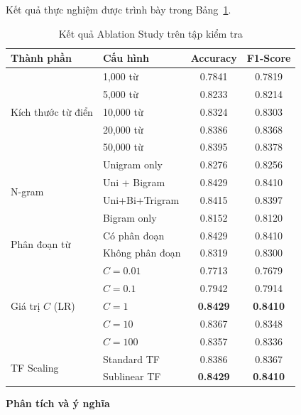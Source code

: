 \documentclass[12pt, a4paper]{report}
\newcommand{\ablVocOneKAcc}{0.7841}
\newcommand{\ablVocOneKF}{0.7819}
\newcommand{\ablVocFiveKAcc}{0.8233}
\newcommand{\ablVocFiveKF}{0.8214}
\newcommand{\ablVocTenKAcc}{0.8324}
\newcommand{\ablVocTenKF}{0.8303}
\newcommand{\ablVocTwentyKAcc}{0.8386}
\newcommand{\ablVocTwentyKF}{0.8368}
\newcommand{\ablVocFiftyKAcc}{0.8395}
\newcommand{\ablVocFiftyKF}{0.8378}
\newcommand{\ablNgUniAcc}{0.8276}
\newcommand{\ablNgUniF}{0.8256}
\newcommand{\ablNgUniBiAcc}{0.8429}
\newcommand{\ablNgUniBiF}{0.8410}
\newcommand{\ablNgUniTriAcc}{0.8415}
\newcommand{\ablNgUniTriF}{0.8397}
\newcommand{\ablNgBiAcc}{0.8152}
\newcommand{\ablNgBiF}{0.8120}
\newcommand{\ablWsOnAcc}{0.8429}
\newcommand{\ablWsOnF}{0.8410}
\newcommand{\ablWsOffAcc}{0.8319}
\newcommand{\ablWsOffF}{0.8300}
\newcommand{\ablCaAcc}{0.7713}        %
\newcommand{\ablCaF}{0.7679}
\newcommand{\ablCbAcc}{0.7942}        %
\newcommand{\ablCbF}{0.7914}
\newcommand{\ablCcAcc}{0.8429}        %
\newcommand{\ablCcF}{0.8410}
\newcommand{\ablCdAcc}{0.8367}        %
\newcommand{\ablCdF}{0.8348}
\newcommand{\ablCeAcc}{0.8357}        %
\newcommand{\ablCeF}{0.8336}
\newcommand{\ablTfStdAcc}{0.8386}
\newcommand{\ablTfStdF}{0.8367}
\newcommand{\ablTfSubAcc}{0.8429}
\newcommand{\ablTfSubF}{0.8410}
\begin{document}
Kết quả thực nghiệm được trình bày trong Bảng~\ref{tab:ablation}.
\begin{table}[H]
\centering
\caption{Kết quả Ablation Study trên tập kiểm tra}
\label{tab:ablation}
\begin{tabular}{llcc}
\toprule
\textbf{Thành phần} & \textbf{Cấu hình} & \textbf{Accuracy} & \textbf{F1-Score} \\
\midrule
\multirow{5}{*}{Kích thước từ điển}
  & 1,000 từ   & \ablVocOneKAcc & \ablVocOneKF \\
  & 5,000 từ   & \ablVocFiveKAcc & \ablVocFiveKF \\
  & 10,000 từ  & \ablVocTenKAcc & \ablVocTenKF \\
  & 20,000 từ  & \ablVocTwentyKAcc & \ablVocTwentyKF \\
  & 50,000 từ  & \ablVocFiftyKAcc & \ablVocFiftyKF \\
\midrule
\multirow{4}{*}{N-gram}
  & Unigram only   & \ablNgUniAcc & \ablNgUniF \\
  & Uni + Bigram   & \ablNgUniBiAcc & \ablNgUniBiF \\
  & Uni+Bi+Trigram & \ablNgUniTriAcc & \ablNgUniTriF \\
  & Bigram only    & \ablNgBiAcc & \ablNgBiF \\
\midrule
\multirow{2}{*}{Phân đoạn từ}
  & Có phân đoạn    & \ablWsOnAcc & \ablWsOnF \\
  & Không phân đoạn & \ablWsOffAcc & \ablWsOffF \\
\midrule
\multirow{5}{*}{Giá trị $C$ (LR)}
  & $C = 0.01$ & \ablCaAcc & \ablCaF \\
  & $C = 0.1$  & \ablCbAcc & \ablCbF \\
  & $C = 1$      & \textbf{\ablCcAcc} & \textbf{\ablCcF} \\
  & $C = 10$     & \ablCdAcc & \ablCdF \\
  & $C = 100$    & \ablCeAcc & \ablCeF \\
\midrule
\multirow{2}{*}{TF Scaling}
  & Standard TF  & \ablTfStdAcc & \ablTfStdF \\
  & Sublinear TF & \textbf{\ablTfSubAcc} & \textbf{\ablTfSubF} \\
\bottomrule
\end{tabular}
\end{table}

\textbf{Phân tích và ý nghĩa}
\end{document}
